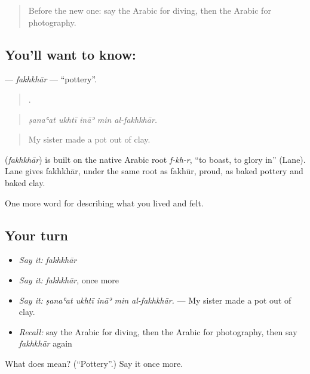 \begin{quote}
Before the new one: say the Arabic for diving, then the Arabic for photography.
\end{quote}

\subsection*{You'll want to know: }
\textbf{} — \emph{fakhkhār} — \textquotedblleft{}pottery\textquotedblright{}.

\begin{quote}
    .
\end{quote}

\begin{quote}
\emph{ṣanaʿat ukhtī ināʾ min al-fakhkhār.}
\end{quote}

\begin{quote}
My sister made a pot out of clay.
\end{quote}

\begin{cousinweb}
\textbf{} (\emph{fakhkhār}) is built on the native Arabic root \emph{f-kh-r}, \textquotedblleft{}to boast, to glory in\textquotedblright{} (Lane). Lane gives fakhkhār, under the same root as fakhūr, proud, as baked pottery and baked clay.
\end{cousinweb}

\begin{grammarlens}[title={What you've built}]
One more word for describing what you lived and felt.
\end{grammarlens}

\subsection*{Your turn}
\begin{itemize}
\raggedright
  \item \emph{Say it:} \emph{fakhkhār}
  \item \emph{Say it:} \emph{fakhkhār}, once more
  \item \emph{Say it:} \emph{ṣanaʿat ukhtī ināʾ min al-fakhkhār.} — My sister made a pot out of clay.
  \item \emph{Recall:} say the Arabic for diving, then the Arabic for photography, then say \emph{fakhkhār} again
\end{itemize}

\begin{tcolorbox}[breakable,colback=teal!4,colframe=teal!35!black,title={Before you move on}]
What does  mean? (\textquotedblleft{}Pottery\textquotedblright{}.) Say it once more.
\end{tcolorbox}
